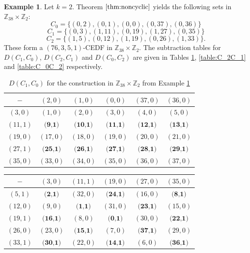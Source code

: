 \documentclass[12pt, a4paper]{article}
\theoremstyle{definition}
\newtheorem{example}[theorem]{Example}
\begin{document}
\begin{example}\label{ex:Z38Z2}
Let $k=2$.  Theorem $\ref{thm:noncyclic}$ yields the following sets in $\mathbb{Z}_{38}\times\mathbb{Z}_2$:
\[C_0=\{(0,2),(0,1),(0,0),(0,37),(0,36)\}\]
\[C_1=\{(0,3),(1,11),(0,19),(1,27),(0,35)\}\]
\[C_2=\{(1,5),(0,12),(1,19),(0,26),(1,33)\}.\]
These form a $(76,3,5,1)$-CEDF in $\mathbb{Z}_{38}\times\mathbb{Z}_2$.  The subtraction tables for $D(C_1,C_0)$, $D(C_2,C_1)$ and $D(C_0,C_2)$ are given in Tables \ref{table:C_1C_0}, \ref{table:C_2C_1} and \ref{table:C_0C_2} respectively.
\begin{table}[h]
\renewcommand{\arraystretch}{1.2}
\centering
\setlength\tabcolsep{3pt}
\begin{tabular}{|c|ccccc|} 
\hline
$-$ & $(2,0)$ & $(1,0)$ & $(0,0)$ & $(37,0)$ & $(36,0)$ \\ \hline
$(3,0)$ & $ (1,0)$	& $(2,0)$ & $(3,0)$ & $(4,0)$	& $(5,0)$ \\
$(11,1)$ & $ \textbf{(9,1)}$ & $	\textbf{(10,1)}$ & $	\textbf{(11,1)}	$ & $\textbf{(12,1)}	$ & $\textbf{(13,1)}$ \\
$(19,0)$ & $ (17,0)$	& $(18,0)$ & $(19,0)$ & $(20,0)$	& $(21,0)$ \\
$(27,1)$ & $ \textbf{(25,1)}$ & $	\textbf{(26,1)}$ & $	\textbf{(27,1)}	$ & $\textbf{(28,1)}	$ & $\textbf{(29,1)}$ \\
$(35,0)$ & $ (33,0)$	& $(34,0)$ & $(35,0)$ & $(36,0)$	& $(37,0)$ \\
\hline
\end{tabular}
	
\caption{$D(C_1,C_0)$ for the construction in $\mathbb{Z}_{38} \times \mathbb{Z}_2$ from Example \ref{ex:Z38Z2}}
\label{table:C_1C_0}
\end{table}

\begin{table}[h]
\renewcommand{\arraystretch}{1.2}
\centering
\setlength\tabcolsep{3pt}
\begin{tabular}{|c|ccccc|} 
\hline
$-$ & $(3,0)$ & $(11,1)$ & $(19,0)$ & $(27,0)$ & $(35,0)$ \\ \hline
$(5,1)$ & $ \textbf{(2,1)}$	& $(32,0)$ & $\textbf{(24,1)}$ & $(16,0)$	& $\textbf{(8,1)}$ \\
$(12,0)$ & $ (9,0)$ & $	\textbf{(1,1)}$ & $	(31,0)	$ & $\textbf{(23,1)}	$ & $(15,0)$ \\
$(19,1)$ & $ \textbf{(16,1)}$	& $(8,0)$ & $\textbf{(0,1)}$ & $(30,0)$	& $\textbf{(22,1)}$ \\
$(26,0)$ & $ (23,0)$ & $	\textbf{(15,1)}$ & $ (7,0)	$ & $\textbf{(37,1)}	$ & $(29,0)$ \\
$(33,1)$ & $ \textbf{(30,1)}$	& $(22,0)$ & $\textbf{(14,1)}$ & $(6,0)$	& $\textbf{(36,1)}$ \\
\hline
\end{tabular}
	

\end{table}
\end{example}
\end{document}
